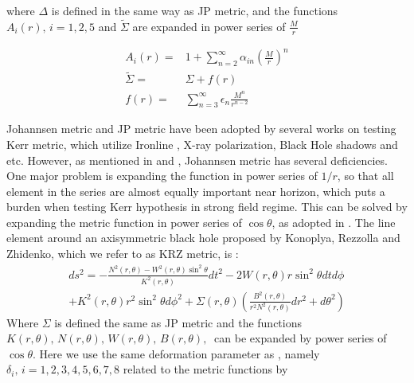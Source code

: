 \documentclass{article}
\begin{document}
where $\Delta$ is defined in the same way as JP metric, and the functions $A_i(r),\,i=1,2,5$ and $\tilde{\Sigma}$ are expanded in power series of $\frac{M}{r}$

\begin{equation}
\begin{aligned}
	A_i(r) =& 1+ \sum_{n=2}^{\infty} \alpha_{in} (\frac M r)^n\\
	\tilde{\Sigma} =& \Sigma +f(r)\\
	f(r)=&\sum_{n=3}^{\infty} \epsilon_n \frac{M^n}{r^{n-2}}
\end{aligned}
\end{equation}

Johannsen metric and JP metric have been adopted by several works on testing Kerr metric, which utilize Ironline\cite{t1_Iron} \cite{t4_Iron}, X-ray polarization\cite{t2_XrayPol}, Black Hole shadows\cite{t3_BHShadow} and etc. However, as mentioned in \cite{johannsen_diff} and \cite {KRZ}, Johannsen metric has several deficiencies. One major problem is expanding the function in power series of $1/r$, so that all element in the series are almost equally important near horizon, which puts a burden when testing Kerr hypothesis in strong field regime. This can be solved by expanding the metric function in power series of $\cos \theta$, as adopted in \cite{KRZ}. The line element around an axisymmetric black hole proposed by Konoplya, Rezzolla and Zhidenko, which we refer to as KRZ metric, is \cite{KRZ}:
\begin{equation}
\begin{aligned}
	ds^2=-\frac{N^2(r,\theta)-W^2(r,\theta)\sin^2\theta}{K^2(r,\theta)} dt^2-2W(r,\theta)r\sin^2\theta dtd\phi \\+ K^2(r,\theta) r^2\sin^2\theta d\phi^2  +\Sigma(r,\theta)(\frac{B^2(r,\theta)}{r^2 N^2(r,\theta)} dr^2+d\theta^2)
\end{aligned}
\end{equation}
Where $\Sigma$ is defined the same as JP metric and the functions $K(r,\theta),\, N(r,\theta),\, W(r,\theta),\, B(r,\theta),\ $ can be expanded by power series of $\cos\theta$. Here we use the same deformation parameter as \cite{cosimoKRZ}, namely $\delta_i, \, i=1,2,3,4,5,6,7,8$ related to the metric functions by
\end{document}
